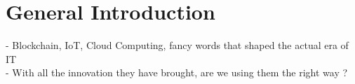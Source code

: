 
\chapter{General Introduction}

\ifpdf
    \graphicspath{{figs/Raster/}{figs/PDF/}{figs/}}
\else
    \graphicspath{{figs/Vector/}{figs/}}
\fi


- Blockchain, IoT, Cloud Computing, fancy words that shaped the actual era of IT \\
- With all the innovation they have brought, are we using them the right way ?


